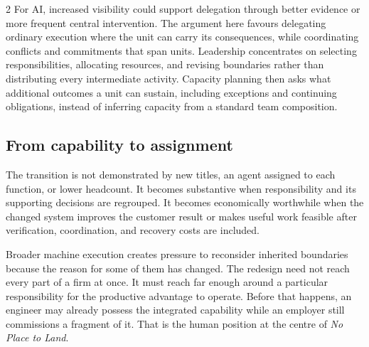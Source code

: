 \begin{multicols}{2}
For AI, increased visibility could support delegation through better
evidence or more frequent central intervention. The argument here
favours delegating ordinary execution where the unit can carry its
consequences, while coordinating conflicts and commitments that span
units. Leadership concentrates on selecting responsibilities, allocating
resources, and revising boundaries rather than distributing every
intermediate activity. Capacity planning then asks what additional
outcomes a unit can sustain, including exceptions and continuing
obligations, instead of inferring capacity from a standard team
composition.

\subsection{From capability to
assignment}\label{from-capability-to-assignment}

The transition is not demonstrated by new titles, an agent assigned to
each function, or lower headcount. It becomes substantive when
responsibility and its supporting decisions are regrouped. It becomes
economically worthwhile when the changed system improves the customer
result or makes useful work feasible after verification, coordination,
and recovery costs are included.

Broader machine execution creates pressure to reconsider inherited
boundaries because the reason for some of them has changed. The redesign
need not reach every part of a firm at once. It must reach far enough
around a particular responsibility for the productive advantage to
operate. Before that happens, an engineer may already possess the
integrated capability while an employer still commissions a fragment of
it. That is the human position at the centre of \emph{No Place to Land}.

\end{multicols}

\RecompositionArt


